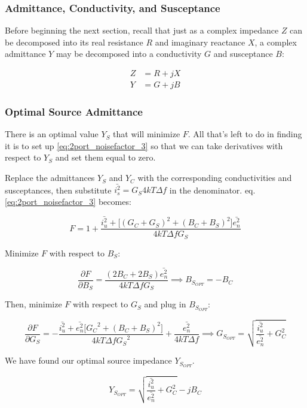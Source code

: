 \subsubsection{Admittance, Conductivity, and Susceptance}
Before beginning the next section, recall that just as a complex impedance $Z$ can be decomposed into its real
resistance $R$ and imaginary reactance $X$, a complex admittance $Y$ may be decomposed into a conductivity $G$ and
susceptance $B$:

\begin{equation}\label{eq:admittance}
    \begin{aligned}
        Z &= R + jX\\
        Y &= G + jB
    \end{aligned}
\end{equation}

\subsubsection{Optimal Source Admittance}
There is an optimal value $Y_S$ that will minimize $F$. All that's left to do in finding it is to set up
\ref{eq:2port_noisefactor_3} so that we can take derivatives with respect to $Y_S$ and set them equal to zero.

Replace the admittances $Y_S$ and $Y_C$ with the corresponding conductivities and susceptances, then substitute
$\bar{i_s^2} = G_S 4kT\Delta f$ in the denominator. eq. \ref{eq:2port_noisefactor_3} becomes:

\begin{equation}\label{eq:2port_noisefactor_4}
    F = 1 + \frac{\bar{i_u^2} + \big[(G_C+G_S)^2 + (B_C+B_S)^2\big] \bar{e_n^2}}{4kT \Delta f G_S}
\end{equation}

Minimize $F$ with respect to $B_S$:

\begin{equation}\label{eq:partial_B_S}
    \frac{\partial F}{\partial B_S} = \frac{(2 B_C + 2 B_S) \bar{e_n^2}}{4kT\Delta f G_S} \implies B_{S_{OPT}} = -B_C
\end{equation}

Then, minimize $F$ with respect to $G_S$ and plug in $B_{S_{OPT}}$:

\begin{equation}\label{eq:partial_G_S}
    \frac{\partial F}{\partial G_S} = -\frac{\bar{i_u^2} + \bar{e_n^2} \big[{G_C}^2 + (B_C+B_S)^2 \big]}{4kT\Delta f
    {G_S}^2} + \frac{\bar{e_n^2}}{4 kT\Delta f} \implies G_{S_{OPT}} = \sqrt{\frac{\bar{i_u^2}}{\bar{e_n^2}} + G_C^2}
\end{equation}

We have found our optimal source impedance $Y_{S_{OPT}}$.

\begin{equation}\label{eq:y_opt}
    Y_{S_{OPT}} =  \sqrt{\frac{\bar{i_u^2}}{\bar{e_n^2}} + G_C^2} - j B_C
\end{equation}
